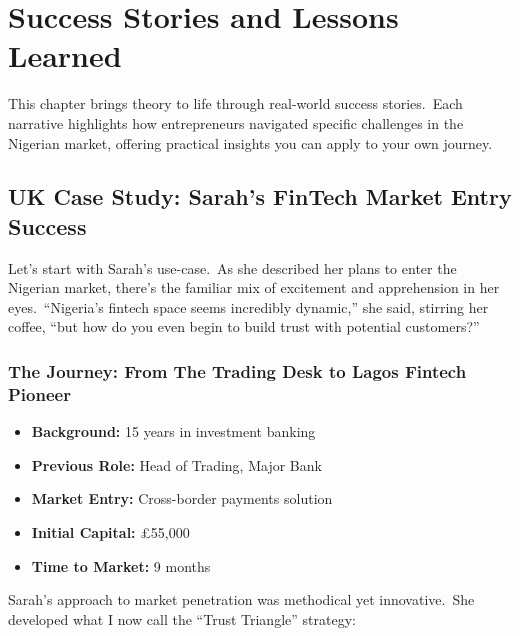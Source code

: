 
\chapter{Success Stories and Lessons Learned}\label{ch:success-stories-and-lessons-learned}

\begin{importantbox}
This chapter brings theory to life through real-world success stories.\ Each narrative highlights how entrepreneurs navigated specific challenges in the Nigerian market, offering practical insights you can apply to your own journey.
\end{importantbox}

\section{UK Case Study: Sarah's FinTech Market Entry Success}\label{sec:uk-case-study:-sarah's-fintech-market-entry-success}

Let's start with Sarah's use-case.\ As she described her plans to enter the Nigerian market, there's the familiar mix of excitement and apprehension in her eyes.\ ``Nigeria's fintech space seems incredibly dynamic,'' she said, stirring her coffee, ``but how do you even begin to build trust with potential customers?''

\subsection{The Journey: From The Trading Desk to Lagos Fintech Pioneer}\label{subsec:the-journey:-from-the-trading-desk-to-lagos-fintech-pioneer}
\begin{tcolorbox}[colback=white,colframe=primarydark,title=\textbf{Sarah's Profile}]
\begin{itemize}
    \item \textbf{Background:} 15 years in investment banking
    \item \textbf{Previous Role:} Head of Trading, Major Bank  
    \item \textbf{Market Entry:} Cross-border payments solution
    \item \textbf{Initial Capital:} £55,000
    \item \textbf{Time to Market:} 9 months
\end{itemize}
\end{tcolorbox}

Sarah's approach to market penetration was methodical yet innovative.\ She developed what I now call the ``Trust Triangle'' strategy:

